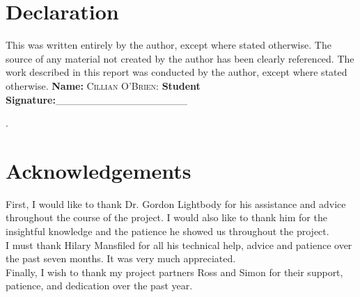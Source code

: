 

\chapter*{Declaration}
\thispagestyle{empty}
This was written entirely by the author, except where stated otherwise. The source of any material not created by the author has been clearly referenced. The work described in this report was conducted by the author, except where stated otherwise.
\vfill
{\bf Name:} \textsc{Cillian O'Brien:} \hspace{2cm} {\bf Student Signature:}{\_\_\_\_\_\_\_\_\_\_\_\_\_\_\_\_\_\_}

\newpage
{\color{white}.}
\thispagestyle{empty}
\clearpage
\newpage

\chapter*{Acknowledgements}
\thispagestyle{empty}
First, I would like to thank Dr. Gordon Lightbody for his assistance and advice throughout the course of the project. I would also like to thank him for the insightful knowledge and the patience he showed us throughout the project.   \\

I must thank Hilary Mansfiled for all his technical help, advice and patience over the past seven months. It was very much appreciated.\\

Finally, I wish to thank my project partners Ross and Simon for their support, patience, and dedication over the past year.


